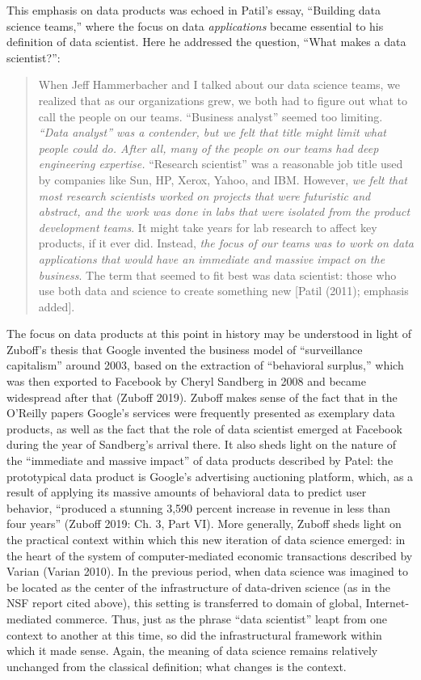 \documentclass[
  letterpaper,
]{report}
\begin{document}
This emphasis on data products was echoed in Patil's essay, ``Building
data science teams,'' where the focus on data \emph{applications} became
essential to his definition of data scientist. Here he addressed the
question, ``What makes a data scientist?'':

\begin{quote}
When Jeff Hammerbacher and I talked about our data science teams, we
realized that as our organizations grew, we both had to figure out what
to call the people on our teams. ``Business analyst'' seemed too
limiting. \emph{``Data analyst'' was a contender, but we felt that title
might limit what people could do. After all, many of the people on our
teams had deep engineering expertise.} ``Research scientist'' was a
reasonable job title used by companies like Sun, HP, Xerox, Yahoo, and
IBM. However, \emph{we felt that most research scientists worked on
projects that were futuristic and abstract, and the work was done in
labs that were isolated from the product development teams}. It might
take years for lab research to affect key products, if it ever did.
Instead, \emph{the focus of our teams was to work on data applications
that would have an immediate and massive impact on the business}. The
term that seemed to fit best was data scientist: those who use both data
and science to create something new {[}Patil (2011); emphasis added{]}.
\end{quote}

The focus on data products at this point in history may be understood in
light of Zuboff's thesis that Google invented the business model of
``surveillance capitalism'' around 2003, based on the extraction of
``behavioral surplus,'' which was then exported to Facebook by Cheryl
Sandberg in 2008 and became widespread after that (Zuboff 2019). Zuboff
makes sense of the fact that in the O'Reilly papers Google's services
were frequently presented as exemplary data products, as well as the
fact that the role of data scientist emerged at Facebook during the year
of Sandberg's arrival there. It also sheds light on the nature of the
``immediate and massive impact'' of data products described by Patel:
the prototypical data product is Google's advertising auctioning
platform, which, as a result of applying its massive amounts of
behavioral data to predict user behavior, ``produced a stunning 3,590
percent increase in revenue in less than four years'' (Zuboff 2019: Ch.
3, Part VI). More generally, Zuboff sheds light on the practical context
within which this new iteration of data science emerged: in the heart of
the system of computer-mediated economic transactions described by
Varian (Varian 2010). In the previous period, when data science was
imagined to be located as the center of the infrastructure of
data-driven science (as in the NSF report cited above), this setting is
transferred to domain of global, Internet-mediated commerce. Thus, just
as the phrase ``data scientist'' leapt from one context to another at
this time, so did the infrastructural framework within which it made
sense. Again, the meaning of data science remains relatively unchanged
from the classical definition; what changes is the context.
\end{document}
